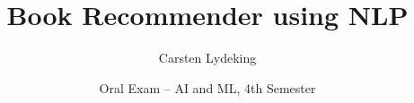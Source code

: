 \documentclass{beamer}
\title{Book Recommender using NLP}
\author{Carsten Lydeking}
\institute{Zealand Business College}
\date{Oral Exam -- AI and ML, 4th Semester}
\begin{document}
\begin{frame}
  \titlepage
\end{frame}




\end{document}

